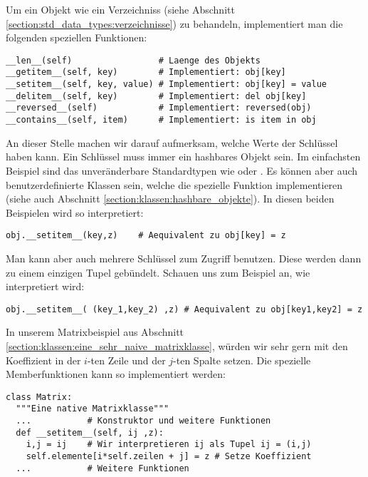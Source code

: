 Um ein Objekt  wie ein Verzeichniss (siehe Abschnitt \ref{section:std_data_types:verzeichnisse}) zu behandeln, implementiert man die folgenden speziellen Funktionen:
\begin{lstlisting}
__len__(self)                 # Laenge des Objekts
__getitem__(self, key)        # Implementiert: obj[key]
__setitem__(self, key, value) # Implementiert: obj[key] = value
__delitem__(self, key)        # Implementiert: del obj[key]
__reversed__(self)            # Implementiert: reversed(obj)
__contains__(self, item)      # Implementiert: is item in obj
\end{lstlisting}
An dieser Stelle machen wir darauf aufmerksam, welche Werte der Schlüssel  haben kann.
Ein Schlüssel muss immer ein hashbares Objekt sein.
Im einfachsten Beispiel sind das unveränderbare Standardtypen wie  oder .
Es können aber auch benutzerdefinierte Klassen sein, welche die spezielle Funktion  implementieren (siehe auch Abschnitt \ref{section:klassen:hashbare_objekte}).
In diesen beiden Beispielen wird  so interpretiert:
\begin{lstlisting}
obj.__setitem__(key,z)    # Aequivalent zu obj[key] = z
\end{lstlisting}
Man kann aber auch mehrere Schlüssel zum Zugriff benutzen.
Diese werden dann zu einem einzigen Tupel gebündelt.
Schauen uns zum Beispiel an, wie  interpretiert wird:
\begin{lstlisting}
obj.__setitem__( (key_1,key_2) ,z) # Aequivalent zu obj[key1,key2] = z
\end{lstlisting}
In unserem Matrixbeispiel aus Abschnitt \ref{section:klassen:eine_sehr_naive_matrixklasse},
würden wir sehr gern mit  den Koeffizient in der $i$-ten Zeile und der $j$-ten Spalte setzen.
Die spezielle Memberfunktionen  kann so implementiert werden:
\begin{lstlisting}
class Matrix:
  """Eine native Matrixklasse"""
  ...           # Konstruktor und weitere Funktionen
  def __setitem__(self, ij ,z):
    i,j = ij    # Wir interpretieren ij als Tupel ij = (i,j)
    self.elemente[i*self.zeilen + j] = z # Setze Koeffizient
  ...           # Weitere Funktionen
\end{lstlisting}

